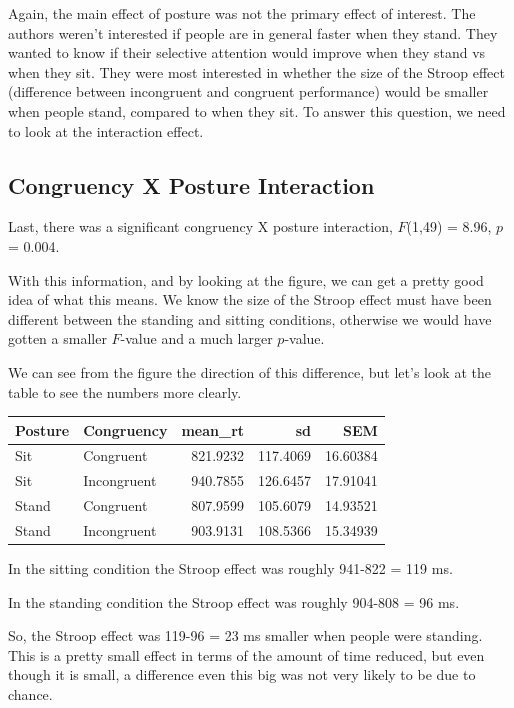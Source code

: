 \documentclass[
]{book}
\begin{document}
Again, the main effect of posture was not the primary effect of interest. The authors weren't interested if people are in general faster when they stand. They wanted to know if their selective attention would improve when they stand vs when they sit. They were most interested in whether the size of the Stroop effect (difference between incongruent and congruent performance) would be smaller when people stand, compared to when they sit. To answer this question, we need to look at the interaction effect.

\subsection{Congruency X Posture Interaction}\label{congruency-x-posture-interaction}

Last, there was a significant congruency X posture interaction, \(F\)(1,49) = 8.96, \(p\) = 0.004.

With this information, and by looking at the figure, we can get a pretty good idea of what this means. We know the size of the Stroop effect must have been different between the standing and sitting conditions, otherwise we would have gotten a smaller \(F\)-value and a much larger \(p\)-value.

We can see from the figure the direction of this difference, but let's look at the table to see the numbers more clearly.

\begin{tabular}{l|l|r|r|r}
\hline
Posture & Congruency & mean\_rt & sd & SEM\\
\hline
Sit & Congruent & 821.9232 & 117.4069 & 16.60384\\
\hline
Sit & Incongruent & 940.7855 & 126.6457 & 17.91041\\
\hline
Stand & Congruent & 807.9599 & 105.6079 & 14.93521\\
\hline
Stand & Incongruent & 903.9131 & 108.5366 & 15.34939\\
\hline
\end{tabular}

In the sitting condition the Stroop effect was roughly 941-822 = 119 ms.

In the standing condition the Stroop effect was roughly 904-808 = 96 ms.

So, the Stroop effect was 119-96 = 23 ms smaller when people were standing. This is a pretty small effect in terms of the amount of time reduced, but even though it is small, a difference even this big was not very likely to be due to chance.
\end{document}
